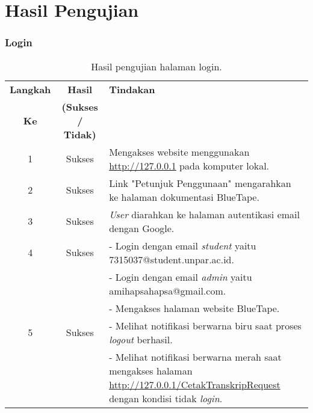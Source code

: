 \section{Hasil Pengujian}
\subsubsection{Login}
\begin{table}[H]
	\centering 
	\caption{Hasil pengujian halaman login.}
	\label{hasil:Login}
	\begin{tabular}{|c|c|p{}|}
		\toprule
		\textbf{Langkah} & \textbf{Hasil} & \textbf{Tindakan}\\
		\textbf{Ke} & \textbf{(Sukses / Tidak)} & \\		
		\midrule
		1 & Sukses & Mengakses website menggunakan \url{http://127.0.0.1} pada komputer lokal.\\
		\hline
		2 & Sukses & Link "Petunjuk Penggunaan" mengarahkan ke halaman dokumentasi BlueTape.\\
		\hline
		3 & Sukses & \textit{User} diarahkan ke halaman autentikasi email dengan Google.\\
		\hline
		4 & Sukses & - Login dengan email \textit{student} yaitu 7315037@student.unpar.ac.id.\\
		&& - Login dengan email \textit{admin} yaitu amihapsahapsa@gmail.com.\\
		&& - Mengakses halaman website BlueTape.\\									
		\hline
		5 & Sukses & - Melihat notifikasi berwarna biru saat proses \textit{logout} berhasil.\\
		&& - Melihat notifikasi berwarna merah saat mengakses halaman \url{http://127.0.0.1/CetakTranskripRequest} dengan kondisi tidak \textit{login}.\\
		\bottomrule		
	\end{tabular} 
\end{table}

